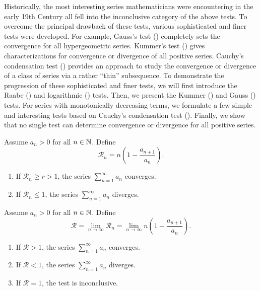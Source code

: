 \begin{remark}
  Historically, the most interesting series mathematicians were
  encountering in the early 19th Century all fell into the
  inconclusive category of the above tests. To overcome the principal
  drawback of these tests, various sophisticated and finer tests were
  developed. For example, Gauss's test ()
  completely sets the convergence for all hypergeometric series.
  Kummer's test () gives characterizations for
  convergence or divergence of all positive series. Cauchy's
  condensation test () provides an
  approach to study the convergence or divergence of a class of
  series via a rather ``thin'' subsequence. To demonstrate the
  progression of these sophisticated and finer tests, we will first
  introduce the Raabe () and logarithmic
  () tests. Then, we present the Kummer
  () and Gauss () tests. For
  series with monotonically decreasing terms, we formulate a few
  simple and interesting tests based on Cauchy's condensation test
  (). Finally, we show that no
  single test can determine convergence or divergence for all positive series.
\end{remark}

\begin{proposition}
  Assume $a_n > 0$ for all $n \in \mathbb N$. Define
  \[ \mathcal{R}_n = n \left(1 - \frac{a_{n + 1}}{a_n}\right). \]
  \begin{enumerate}
    \item If $\mathcal{R}_n \geq r > 1$, the series $\sum_{n =
      1}^{\infty} a_n$ converges.
    \item If $\mathcal{R}_n \leq 1$, the series $\sum_{n =
      1}^{\infty} a_n$ diverges.
  \end{enumerate}
\end{proposition}

\begin{proposition}
  Assume $a_n > 0$ for all $n \in \mathbb N$. Define
  \[ \mathcal{R} = \lim_{n \to \infty} \mathcal{R}_n = \lim_{n \to
  \infty} n \left(1 - \frac{a_{n + 1}}{a_n}\right). \]
  \begin{enumerate}
    \item If $\mathcal{R} > 1$, the series $\sum_{n = 1}^{\infty}
      a_n$ converges.
    \item If $\mathcal{R} < 1$, the series $\sum_{n = 1}^{\infty} a_n$ diverges.
    \item If $\mathcal{R} = 1$, the test is inconclusive.
  \end{enumerate}
\end{proposition}

